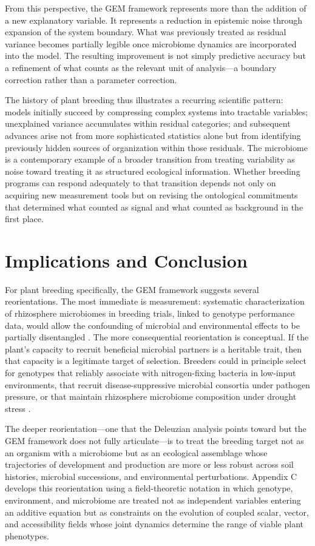 \documentclass[11pt, a4paper]{article}
\begin{document}
From this perspective, the GEM framework represents more than the addition of a new explanatory variable. It represents a reduction in epistemic noise through expansion of the system boundary. What was previously treated as residual variance becomes partially legible once microbiome dynamics are incorporated into the model. The resulting improvement is not simply predictive accuracy but a refinement of what counts as the relevant unit of analysis---a boundary correction rather than a parameter correction.

The history of plant breeding thus illustrates a recurring scientific pattern: models initially succeed by compressing complex systems into tractable variables; unexplained variance accumulates within residual categories; and subsequent advances arise not from more sophisticated statistics alone but from identifying previously hidden sources of organization within those residuals. The microbiome is a contemporary example of a broader transition from treating variability as noise toward treating it as structured ecological information. Whether breeding programs can respond adequately to that transition depends not only on acquiring new measurement tools but on revising the ontological commitments that determined what counted as signal and what counted as background in the first place.

\section{Implications and Conclusion}

For plant breeding specifically, the GEM framework suggests several reorientations. The most immediate is measurement: systematic characterization of rhizosphere microbiomes in breeding trials, linked to genotype performance data, would allow the confounding of microbial and environmental effects to be partially disentangled \citep{week2025, mueller2022}. The more consequential reorientation is conceptual. If the plant's capacity to recruit beneficial microbial partners is a heritable trait, then that capacity is a legitimate target of selection. Breeders could in principle select for genotypes that reliably associate with nitrogen-fixing bacteria in low-input environments, that recruit disease-suppressive microbial consortia under pathogen pressure, or that maintain rhizosphere microbiome composition under drought stress \citep{zancarini2024, dwivedi2025}.

The deeper reorientation---one that the Deleuzian analysis points toward but the GEM framework does not fully articulate---is to treat the breeding target not as an organism with a microbiome but as an ecological assemblage whose trajectories of development and production are more or less robust across soil histories, microbial successions, and environmental perturbations. Appendix C develops this reorientation using a field-theoretic notation in which genotype, environment, and microbiome are treated not as independent variables entering an additive equation but as constraints on the evolution of coupled scalar, vector, and accessibility fields whose joint dynamics determine the range of viable plant phenotypes.
\end{document}
